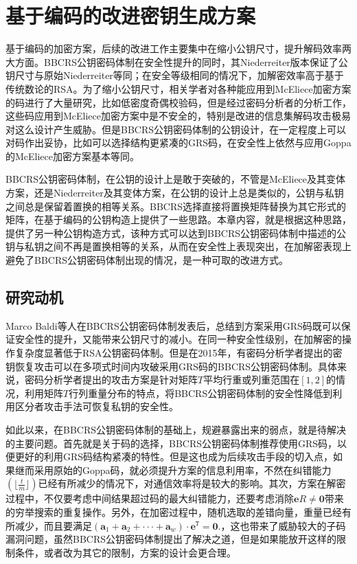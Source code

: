 \chapter{基于编码的改进密钥生成方案}
基于编码的加密方案，后续的改进工作主要集中在缩小公钥尺寸，提升解码效率两大方面。BBCRS公钥密码体制在安全性提升的同时，其Niederreiter版本保证了公钥尺寸与原始Niederreiter等同；在安全等级相同的情况下，加解密效率高于基于传统数论的RSA。为了缩小公钥尺寸，相关学者对各种能应用到McEliece加密方案的码进行了大量研究，比如低密度奇偶校验码，但是经过密码分析者的分析工作，这些码应用到McEliece加密方案中是不安全的，特别是改进的信息集解码攻击极易对这么设计产生威胁。但是BBCRS公钥密码体制的公钥设计，在一定程度上可以对码作出妥协，比如可以选择结构更紧凑的GRS码，在安全性上依然与应用Goppa的McEliece加密方案基本等同。

BBCRS公钥密码体制，在公钥的设计上是敢于突破的，不管是McEliece及其变体方案，还是Niederreiter及其变体方案，在公钥的设计上总是类似的，公钥与私钥之间总是保留着置换的相等关系。BBCRS选择直接将置换矩阵替换为其它形式的矩阵，在基于编码的公钥构造上提供了一些思路。本章内容，就是根据这种思路，提供了另一种公钥构造方式，该种方式可以达到BBCRS公钥密码体制中描述的公钥与私钥之间不再是置换相等的关系，从而在安全性上表现突出，在加解密表现上避免了BBCRS公钥密码体制出现的情况，是一种可取的改进方式。

\section{研究动机}
Marco Baldi等人在BBCRS公钥密码体制发表后，总结到方案采用GRS码既可以保证安全性的提升，又能带来公钥尺寸的减小。在同一种安全性级别，在加解密的操作复杂度显著低于RSA公钥密码体制。但是在2015年，有密码分析学者提出的密钥恢复攻击\cite{Couvreur2015A}可以在多项式时间内攻破采用GRS码的BBCRS公钥密码体制。具体来说，密码分析学者提出的攻击方案是针对矩阵$T$平均行重或列重范围在$[1,2]$的情况，利用矩阵$T$行列重量分布的特点，将BBCRS公钥密码体制的安全性降低到利用区分者攻击手法可恢复私钥的安全性。

如此以来，在BBCRS公钥密码体制的基础上，规避暴露出来的弱点，就是待解决的主要问题。首先就是关于码的选择，BBCRS公钥密码体制推荐使用GRS码，以便更好的利用GRS码结构紧凑的特性。但是这也成为后续攻击手段的切入点，如果继而采用原始的Goppa码，就必须提升方案的信息利用率，不然在纠错能力$(\lfloor \frac{t}{m} \rfloor)$已经有所减少的情况下，对通信效率将是较大的影响。其次，方案在解密过程中，不仅要考虑中间结果超过码的最大纠错能力，还要考虑消除$\mathbf{e}R \neq \mathbf{0}$带来的穷举搜索的重复操作。另外，在加密过程中，随机选取的差错向量，重量已经有所减少，而且要满足$(\mathbf{a}_1 + \mathbf{a}_2 + ··· + \mathbf{a}_w) \cdot \mathbf{e}^\mathtt{T} = \mathbf{0}.$，这也带来了威胁较大的子码漏洞问题，虽然BBCRS公钥密码体制提出了解决之道，但是如果能放开这样的限制条件，或者改为其它的限制，方案的设计会更合理。

